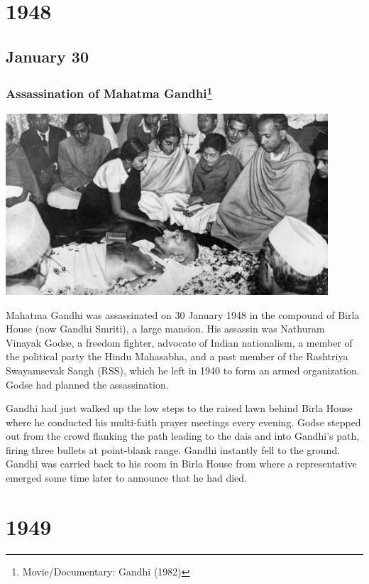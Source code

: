 \documentclass[11pt]{report}
\begin{document}
\chapter{1948}
\section{January 30}
\subsection{Assassination of Mahatma Gandhi\protect\footnote{Movie/Documentary: Gandhi (1982)}}
\vspace{2mm}\begin{center}\includegraphics[width=12cm]{./img/gandhiDead.jpg}\end{center}
Mahatma Gandhi was assassinated on 30 January 1948 in the compound of Birla House (now Gandhi Smriti), a large mansion. His assassin was Nathuram Vinayak Godse, a freedom fighter, advocate of Indian nationalism, a member of the political party the Hindu Mahasabha, and a past member of the Rashtriya Swayamsevak Sangh (RSS), which he left in 1940 to form an armed organization. Godse had planned the assassination.

Gandhi had just walked up the low steps to the raised lawn behind Birla House where he conducted his multi-faith prayer meetings every evening. Godse stepped out from the crowd flanking the path leading to the dais and into Gandhi's path, firing three bullets at point-blank range. Gandhi instantly fell to the ground. Gandhi was carried back to his room in Birla House from where a representative emerged some time later to announce that he had died.

\chapter{1949}
\end{document}
